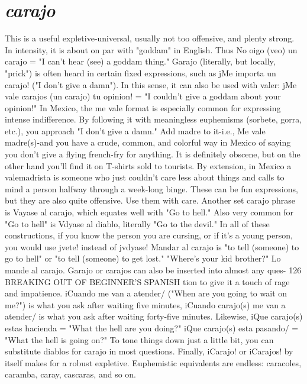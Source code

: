 \section{\emph{carajo}}

This is a useful expletive-universal, usually not too offensive, and plenty strong. In intensity, it is about on par with "goddam"
in English. Thus No oigo (veo) un carajo = "I can't hear (see) a goddam thing." Garajo (literally, but locally, "prick") is often heard in certain fixed expressions, such as jMe importa un carajo! ("I don't give a
damn"). In this sense, it can also be used with valer: jMe vale carajos
(un carajo) tu opinion! = "I couldn't give a goddam about your
opinion!"
In Mexico, the me vale format is especially common for expressing intense indifference. By following it with meaningless euphemisms (sorbete, gorra, etc.), you approach "I don't give a damn." Add
madre to it-i.e., Me vale madre(s)-and you have a crude, common,
and colorful way in Mexico of saying you don't give a flying french-fry
for anything. It is definitely obscene, but on the other hand you'll find
it on T-shirts sold to tourists. By extension, in Mexico a valemadrista
is someone who just couldn't care less about things and calls to mind
a person halfway through a week-long binge. These can be fun expressions, but they are also quite offensive. Use them with care.
Another set carajo phrase is Vayase al carajo, which equates
well with "Go to hell." Also very common for "Go to hell" is Vdyase
al diablo, literally "Go to the devil." In all of these constructions, if
you know the person you are cursing, or if it's a young person, you
would use jvete! instead of jvdyase! Mandar al carajo is "to tell (someone) to go to hell" or "to tell (someone) to get lost." "Where's your kid
brother?" Lo mande al carajo.
Garajo or carajos can also be inserted into almost any ques-
126 BREAKING OUT OF BEGINNER'S SPANISH
tion to give it a touch of rage and impatience. iCuando me van a atender/ ("When are you going to wait on me?") is what you ask after waiting five minutes, iCuando carajo(s) me van a atender/ is what you ask
after waiting forty-five minutes. Likewise, iQue carajo(s) estas hacienda = "What the hell are you doing?" iQue carajo(s) esta pasando/
= "What the hell is going on?" To tone things down just a little bit,
you can substitute diablos for carajo in most questions.
Finally, iCarajo! or iCarajos! by itself makes for a robust expletive. Euphemistic equivalents are endless: caracoles, caramba,
caray, cascaras, and so on.

